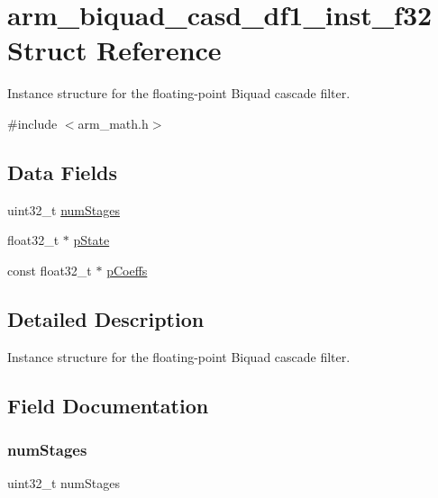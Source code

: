 \hypertarget{structarm__biquad__casd__df1__inst__f32}{}\section{arm\+\_\+biquad\+\_\+casd\+\_\+df1\+\_\+inst\+\_\+f32 Struct Reference}
\label{structarm__biquad__casd__df1__inst__f32}


Instance structure for the floating-\/point Biquad cascade filter.  




{\ttfamily \#include $<$arm\+\_\+math.\+h$>$}

\subsection*{Data Fields}
\begin{DoxyCompactItemize}
\item 
uint32\+\_\+t \mbox{\hyperlink{structarm__biquad__casd__df1__inst__f32_aed9c8a6224cd149e8e12b17b25b9b767}{num\+Stages}}
\item 
float32\+\_\+t $\ast$ \mbox{\hyperlink{structarm__biquad__casd__df1__inst__f32_a335c87e6fdc4b96601d95a5de8b9c463}{p\+State}}
\item 
const float32\+\_\+t $\ast$ \mbox{\hyperlink{structarm__biquad__casd__df1__inst__f32_a39230f04a29d8321948e339633780442}{p\+Coeffs}}
\end{DoxyCompactItemize}


\subsection{Detailed Description}
Instance structure for the floating-\/point Biquad cascade filter. 

\subsection{Field Documentation}
\mbox{\label{structarm__biquad__casd__df1__inst__f32_aed9c8a6224cd149e8e12b17b25b9b767}} 
\subsubsection{\texorpdfstring{numStages}{numStages}}
{\footnotesize\ttfamily uint32\+\_\+t num\+Stages}

